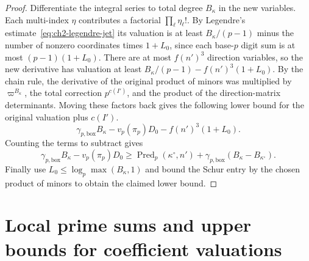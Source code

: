 \begin{proof}
Differentiate the integral series to total degree $B_\kappa$ in the new variables. Each multi-index $\eta$ contributes a factorial $\prod_\ell\eta_\ell!$. By Legendre's estimate~\eqref{eq:ch2-legendre-jet} its valuation is at least $B_\kappa/(p-1)$ minus the number of nonzero coordinates times $1+L_0$, since each base-$p$ digit sum is at most $(p-1)(1+L_0)$. There are at most $f(n')^3$ direction variables, so the new derivative has valuation at least $B_\kappa/(p-1)-f(n')^3(1+L_0)$. By the chain rule, the derivative of the original product of minors was multiplied by $\varpi^{B_\kappa}$, the total correction $p^{c(I')}$, and the product of the direction-matrix determinants. Moving these factors back gives the following lower bound for the original valuation plus $c(I')$.
\[
 \gamma_{p,\mathrm{box}} B_\kappa-v_p(\pi_p)D_0
 -f(n')^3(1+L_0).
\]
Counting the terms to subtract gives
\[
 \gamma_{p,\mathrm{box}} B_\kappa-v_p(\pi_p)D_0
 \ge\operatorname{Pred}_p(\kappa^\circ,n')
   +\gamma_{p,\mathrm{box}}(B_\kappa-B_{\kappa^\circ}).
\]
Finally use $L_0\le\log_p\max(B_\kappa,1)$ and bound the Schur entry by the chosen product of minors to obtain the claimed lower bound.
\end{proof}

\section{Local prime sums and upper bounds for coefficient valuations}
\label{sec:ch2-sharpness}

